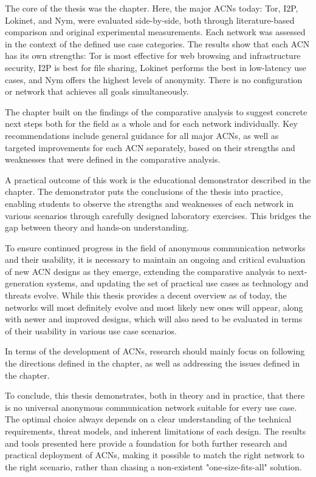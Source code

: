 The core of the thesis was the  chapter. Here, the major ACNs today: Tor, I2P, Lokinet, and Nym, were evaluated side-by-side, both through literature-based comparison and original experimental measurements. Each network was assessed in the context of the defined use case categories. The results show that each ACN has its own strengths: Tor is most effective for web browsing and infrastructure security, I2P is best for file sharing, Lokinet performs the best in low-latency use cases, and Nym offers the highest levels of anonymity. There is no configuration or network that achieves all goals simultaneously.

The chapter  built on the findings of the comparative analysis to suggest concrete next steps both for the field as a whole and for each network individually. Key recommendations include general guidance for all major ACNs, as well as targeted improvements for each ACN separately, based on their strengths and weaknesses that were defined in the comparative analysis.

A practical outcome of this work is the educational demonstrator described in the  chapter. The demonstrator puts the conclusions of the thesis into practice, enabling students to observe the strengths and weaknesses of each network in various scenarios through carefully designed laboratory exercises. This bridges the gap between theory and hands-on understanding.

To ensure continued progress in the field of anonymous communication networks and their usability, it is necessary to maintain an ongoing and critical evaluation of new ACN designs as they emerge, extending the comparative analysis to next-generation systems, and updating the set of practical use cases as technology and threats evolve. While this thesis provides a decent overview as of today, the networks will most definitely evolve and most likely new ones will appear, along with newer and improved designs, which will also need to be evaluated in terms of their usability in various use case scenarios.

In terms of the development of ACNs, research should mainly focus on following the directions defined in the  chapter, as well as addressing the issues defined in the  chapter.

To conclude, this thesis demonstrates, both in theory and in practice, that there is no universal anonymous communication network suitable for every use case. The optimal choice always depends on a clear understanding of the technical requirements, threat models, and inherent limitations of each design. The results and tools presented here provide a foundation for both further research and practical deployment of ACNs, making it possible to match the right network to the right scenario, rather than chasing a non-existent "one-size-fits-all" solution.
